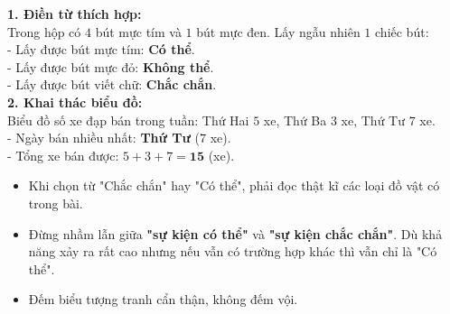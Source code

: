 \documentclass[10pt,a4paper]{article}
\begin{document}
\vspace{-1.5mm}
\noindent
\begin{minipage}[t]{0.49\textwidth}\vspace{0pt}
\begin{tcolorbox}[
  enhanced,
  colback=green!4!white,
  colframe=green!60!black,
  arc=2mm, boxrule=0.8pt,
  left=2mm, right=2mm, top=1.8mm, bottom=1.8mm,
  title={\footnotesize\bfseries\color{white}\faCheckCircle\ 4. Bài tập thực hành mẫu}
]
{\footnotesize
\textbf{1. Điền từ thích hợp:}\\
Trong hộp có $4$ bút mực tím và $1$ bút mực đen. Lấy ngẫu nhiên $1$ chiếc bút:\\
- Lấy được bút mực tím: \textbf{Có thể}.\\
- Lấy được bút mực đỏ: \textbf{Không thể}.\\
- Lấy được bút viết chữ: \textbf{Chắc chắn}.\\
\textbf{2. Khai thác biểu đồ:}\\
Biểu đồ số xe đạp bán trong tuần: Thứ Hai $5$ xe, Thứ Ba $3$ xe, Thứ Tư $7$ xe.\\
- Ngày bán nhiều nhất: \textbf{Thứ Tư} ($7$ xe).\\
- Tổng xe bán được: $5 + 3 + 7 = \mathbf{15}$ (xe).
}
\end{tcolorbox}
\end{minipage}
\hfill
\begin{minipage}[t]{0.49\textwidth}\vspace{0pt}
\begin{tcolorbox}[
  enhanced,
  colback=rose!4!white,
  colframe=rose!70!black,
  arc=2mm, boxrule=0.8pt,
  left=2mm, right=2mm, top=1.8mm, bottom=1.8mm,
  title={\footnotesize\bfseries\color{white}\faExclamationTriangle\ 5. Lời dặn dò kĩ năng}
]
{\footnotesize
\begin{itemize}\setlength{\itemsep}{1.5pt}\setlength{\leftskip}{-2.5mm}
  \item Khi chọn từ "Chắc chắn" hay "Có thể", phải đọc thật kĩ các loại đồ vật có trong bài.
  \item Đừng nhầm lẫn giữa \textbf{"sự kiện có thể"} và \textbf{"sự kiện chắc chắn"}. Dù khả năng xảy ra rất cao nhưng nếu vẫn có trường hợp khác thì vẫn chỉ là "Có thể".
  \item Đếm biểu tượng tranh cẩn thận, không đếm vội.
\end{itemize}
}
\end{tcolorbox}
\end{minipage}
\end{document}
